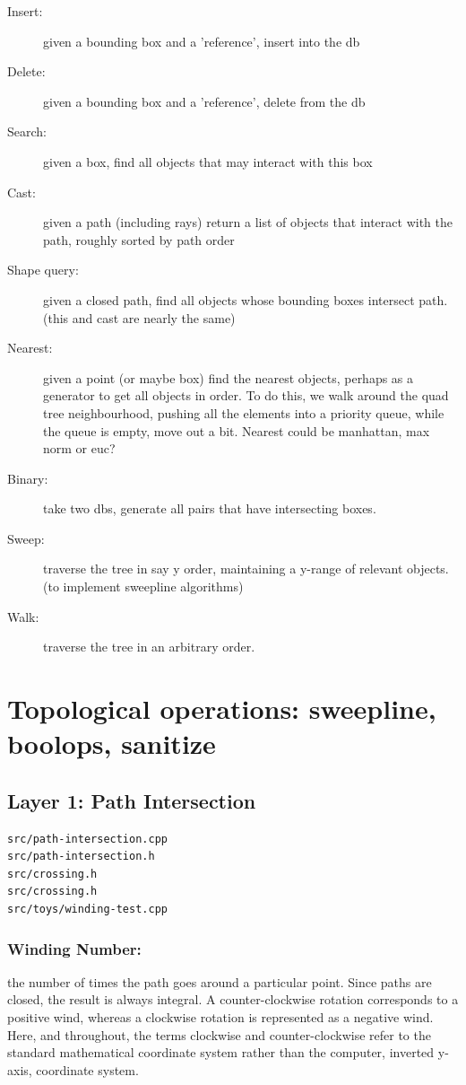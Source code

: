 \documentclass[openany]{book}
\begin{document}
\begin{description}
\item[Insert:] given a bounding box and a 'reference', insert into the db
\item[Delete:] given a bounding box and a 'reference', delete from the db
\item[Search:] given a box, find all objects that may interact with this box
\item[Cast:] given a path (including rays) return a list of objects that interact with the path, roughly sorted by path order
\item[Shape query:] given a closed path, find all objects whose bounding boxes intersect path.  (this and cast are nearly the same)
\item[Nearest:] given a point (or maybe box) find the nearest objects, perhaps as a generator to get all objects in order.  To do this, we walk around the quad tree neighbourhood, pushing all the elements into a priority queue, while the queue is empty, move out a bit.  Nearest could be manhattan, max norm or euc?
\item[Binary:] take two dbs, generate all pairs that have intersecting boxes.
\item[Sweep:] traverse the tree in say y order, maintaining a y-range of relevant objects. (to implement sweepline algorithms)
\item[Walk:] traverse the tree in an arbitrary order.
\end{description}

\chapter{Topological operations: sweepline, boolops, sanitize}
\section{Layer 1: Path Intersection}

\begin{verbatim}
src/path-intersection.cpp
src/path-intersection.h
src/crossing.h
src/crossing.h
src/toys/winding-test.cpp
\end{verbatim}

\subsection{Winding Number:}
 the number of times the path goes around a particular point. Since paths are closed, the result is always integral. A counter-clockwise rotation corresponds to a positive wind, whereas a clockwise rotation is represented as a negative wind. Here, and throughout, the terms clockwise and counter-clockwise refer to the standard mathematical coordinate system rather than the computer, inverted y-axis, coordinate system.
\end{document}
